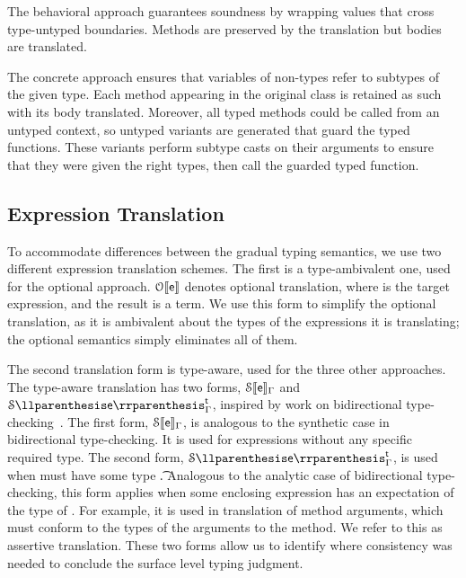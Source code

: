 \documentclass[USenglish]{tex/lipics-v2016}f
\begin{document}
\vspace{2mm} The behavioral approach guarantees
soundness by wrapping values that cross type-untyped boundaries. Methods
are preserved by the translation but bodies are translated.

\vspace{2mm} The concrete approach ensures that
variables of non-\any types refer to subtypes of the given type. Each method
appearing in the original class is retained as such with its body
translated.  Moreover, all typed methods could be called from an untyped
context, so untyped variants are generated that guard the typed functions.
These variants perform subtype casts on their arguments to ensure that they
were given the right types, then call the guarded typed function.

\subsection{Expression Translation} 

To accommodate differences between the gradual typing semantics, we use two
different expression translation schemes. The first is a type-ambivalent
one, used for the optional approach. $\TR[\OTS]\e$ denotes optional translation,
where \e is the target expression, and the result is a \kafka term. We use
this form to simplify the optional translation, as it is ambivalent about the
types of the expressions it is translating; the optional semantics simply
eliminates all of them.

The second translation form is type-aware, used for the three other approaches. The
type-aware translation has two forms, $\TRG[\SOMS]\e\Env$ and
$\TAG[\SOMS]\e\Env\t$, inspired by work on bidirectional
type-checking~\cite{pierce:1998:local}.  The first form,
$\TRG[\SOMS]\e\Env$, is analogous to the synthetic case in bidirectional
type-checking.  It is used for expressions without any specific required
type.  The second form, $\TAG[\SOMS]\e\Env\t$, is used when \e must have
some type \t. Analogous to the analytic case of bidirectional
type-checking, this form applies when some enclosing expression has an
expectation of the type of \e. For example, it is used in translation of
method arguments, which must conform to the types of the arguments to the
method. We refer to this as assertive translation. These two forms allow us to identify
where consistency was needed to conclude the surface level typing judgment.
\end{document}
